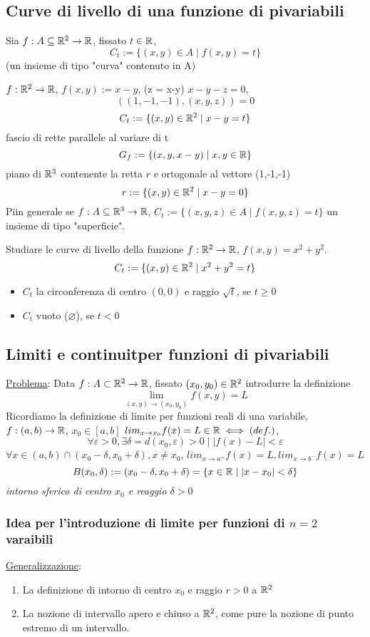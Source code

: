 \subsection{Curve di livello di una funzione di pi\acu variabili}
Sia $f: A \subseteq \mathbb{R}^2 \to \mathbb{R}$, fissato $t \in \mathbb{R}$, 
$$C_t := \{(x,y) \in A \mid f(x,y) = t\}$$
(\ace un insieme di tipo "curva" contenuto in A)
\begin{example}
  $f : \mathbb{R}^2 \to \mathbb{R}$, $f(x,y) := x-y$, (z = x-y) $x-y-z = 0$, $$((1,-1,-1),(x,y,z)) = 0$$
  $$C_t := \{(x,y) \in \mathbb{R}^2 \mid x-y = t\}$$ fascio di rette parallele al variare di t
  $$G_f := \{(x,y,x-y) \mid x,y \in \mathbb{R}\}$$ piano di $\mathbb{R}^3$ contenente la retta $r$ e ortogonale
  al vettore (1,-1,-1)
  $$r:= \{(x,y)\in \mathbb{R}^2\mid x-y = 0\}$$
  Pi\acu in generale se $f: A \subseteq \mathbb{R}^3 \to \mathbb{R}$, $C_t := \{(x,y,z) \in A \mid f(x,y,z) = t\}$ \ace un insieme di tipo 
  "superficie". 
\end{example} 
\begin{exercise}
  Studiare le curve di livello della funzione $f:\mathbb{R}^2 \to \mathbb{R}$, $f(x,y) = x^2 + y^2$.
  $$C_t := \{(x,y)\in \mathbb{R}^2 \mid x^2 + y^2 = t\}$$
  \begin{itemize}
    \item $C_t$ \ace la circonferenza di centro $(0,0)$ e raggio $\sqrt{t}$, se $t\geq 0$
    \item $C_t$ \ace vuoto ($\varnothing$), se $t < 0$
  \end{itemize}
\end{exercise}
\subsection{Limiti e continuit\aca per funzioni di pi\acu variabili}
\underline{Problema}: Data $f:A \subset \mathbb{R}^2 \to \mathbb{R}$, fissato $(x_0, y_0)\in \mathbb{R}^2$ introdurre la definizione 
$$\lim_{(x,y)\to (x_0,y_0)} f(x,y) = L$$
Ricordiamo la definizione di limite per funzioni reali di una variabile, $f:(a,b)\to \mathbb{R}$, $x_0 \in [a,b]$
$lim_{x\to x_0} f(x) = L \in \mathbb{R} \iff (def.)$, 
$$\forall \varepsilon > 0, \exists \delta = d(x_0, \varepsilon) > 0 \mid \lvert f(x)-L \rvert < \varepsilon$$ 
$\forall x \in (a,b) \cap (x_0-\delta, x_0+\delta), x \not = x_0$, $lim_{x\to a^{+}} f(x) = L, lim_{x\to b^{-}} f(x) = L$
$$B(x_0,\delta) := (x_0-\delta, x_0+\delta) = \{x\in \mathbb{R} \mid \lvert x-x_0\rvert < \delta\}$$
\textit{intorno sferico di centro $x_0$ e reaggio $\delta > 0$}
\subsubsection{Idea per l'introduzione di limite per funzioni di $n=2$ varaibili}
\underline{Generalizzazione}:
\begin{enumerate}
  \item La definizione di intorno di centro $x_0$ e raggio $r > 0$ a $\mathbb{R}^2$
  \item La nozione di intervallo apero e chiuso a $\mathbb{R}^2$, come pure la nozione di punto 
        estremo di un intervallo.
\end{enumerate}
